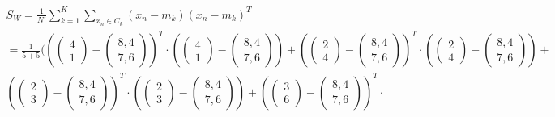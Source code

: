 \documentclass[a4paper,parskip=full-]{article}
\begin{document}
\begin{multline}
S_W =  \frac{1}{N'} \sum^K_{k=1} \sum_{x_n \in C_k} (x_n-m_k)(x_n-m_k)^T \\
=  \frac{1}{5+5} \Biggl(
\left( \begin{pmatrix} 4 \\ 1 \end{pmatrix} - \begin{pmatrix} 8,4 \\ 7,6 \end{pmatrix} \right)^T \cdot
\left( \begin{pmatrix} 4 \\ 1 \end{pmatrix} - \begin{pmatrix} 8,4 \\ 7,6 \end{pmatrix} \right) + 
\left( \begin{pmatrix} 2 \\ 4 \end{pmatrix} - \begin{pmatrix} 8,4 \\ 7,6 \end{pmatrix} \right)^T \cdot
\left( \begin{pmatrix} 2 \\ 4 \end{pmatrix} - \begin{pmatrix} 8,4 \\ 7,6 \end{pmatrix} \right) + \\
\left( \begin{pmatrix} 2 \\ 3 \end{pmatrix} - \begin{pmatrix} 8,4 \\ 7,6 \end{pmatrix} \right)^T \cdot
\left( \begin{pmatrix} 2 \\ 3 \end{pmatrix} - \begin{pmatrix} 8,4 \\ 7,6 \end{pmatrix} \right) + 
\left( \begin{pmatrix} 3 \\ 6 \end{pmatrix} - \begin{pmatrix} 8,4 \\ 7,6 \end{pmatrix} \right)^T \cdot

\end{multline}
\end{document}
